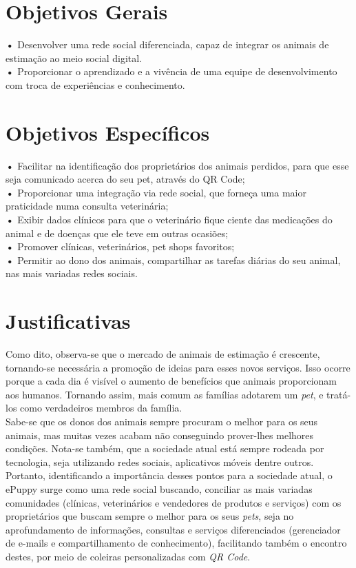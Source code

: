 \section{Objetivos Gerais}
\textbf{•} Desenvolver uma rede social diferenciada, capaz de integrar os animais de estimação ao meio social digital.
\\
\indent
\textbf{•} Proporcionar o aprendizado e a vivência de uma equipe de desenvolvimento com troca de experiências e conhecimento.

\section{Objetivos Específicos}
\textbf{•} Facilitar na identificação dos proprietários dos animais perdidos, para que esse seja comunicado acerca do seu pet, através do QR Code;
\\
\indent
\textbf{•} Proporcionar uma integração via rede social, que forneça uma maior praticidade numa consulta veterinária;
\\
\indent
\textbf{•} Exibir dados clínicos para que o veterinário fique ciente das medicações do animal e de doenças que ele teve em outras ocasiões;
\\
\indent
\textbf{•} Promover clínicas, veterinários, pet shops favoritos;
\\
\indent
\textbf{•} Permitir ao dono dos animais, compartilhar as tarefas diárias do seu animal, nas mais variadas redes sociais.

\section{Justificativas}

Como dito, observa-se que o mercado de animais de estimação é crescente, tornando-se necessária a promoção de ideias para esses novos serviços. Isso ocorre porque a cada dia é visível o aumento de benefícios que animais proporcionam aos humanos. Tornando assim, mais comum as famílias adotarem um {\it pet}, e tratá-los como verdadeiros membros da família.
\\
\indent
Sabe-se que os donos dos animais sempre procuram o melhor para os seus animais, mas muitas vezes acabam não conseguindo prover-lhes melhores condições. Nota-se também, que a sociedade atual está sempre rodeada por tecnologia, seja utilizando redes sociais, aplicativos móveis dentre outros.
\\
\indent
Portanto, identificando a importância desses pontos para a sociedade atual, o ePuppy surge como uma rede social buscando, conciliar as mais variadas comunidades (clínicas, veterinários e vendedores de produtos e serviços) com os proprietários que buscam sempre o melhor para os seus {\it pets}, seja no aprofundamento de informações, consultas e serviços diferenciados (gerenciador de e-mails e compartilhamento de conhecimento), facilitando também o encontro destes, por meio de coleiras personalizadas com {\it QR Code}.

